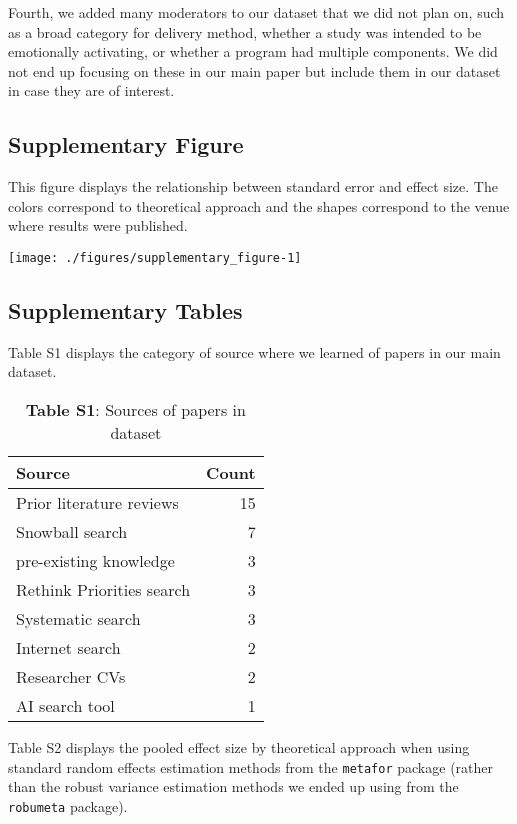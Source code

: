 \documentclass[sn-nature,pdflatex]{sn-jnl}
\begin{document}
Fourth, we added many moderators to our dataset that we did not plan on,
such as a broad category for delivery method, whether a study was
intended to be emotionally activating, or whether a program had multiple
components. We did not end up focusing on these in our main paper but
include them in our dataset in case they are of interest.

\subsection{Supplementary Figure}\label{supplementary-figure}

This figure displays the relationship between standard error and effect
size. The colors correspond to theoretical approach and the shapes
correspond to the venue where results were published.

\texttt{[image: ./figures/supplementary\_figure-1]}

\subsection{Supplementary Tables}\label{supplementary-tables}

Table S1 displays the category of source where we learned of papers in
our main dataset. \captionsetup[table]{labelformat=empty}

\begin{table}[!h]
\centering
\caption{\label{tab:supp_table_one}\textbf{Table S1}: Sources of papers in dataset}
\centering
\begin{tabular}[t]{lr}
\toprule
Source & Count\\
\midrule
Prior literature reviews & 15\\
Snowball search & 7\\
pre-existing knowledge & 3\\
Rethink Priorities search & 3\\
Systematic search & 3\\
\addlinespace
Internet search & 2\\
Researcher CVs & 2\\
AI search tool & 1\\
\bottomrule
\end{tabular}
\end{table}

Table S2 displays the pooled effect size by theoretical approach when
using standard random effects estimation methods from the
\texttt{metafor} package (rather than the robust variance estimation
methods we ended up using from the \texttt{robumeta} package).
\end{document}
